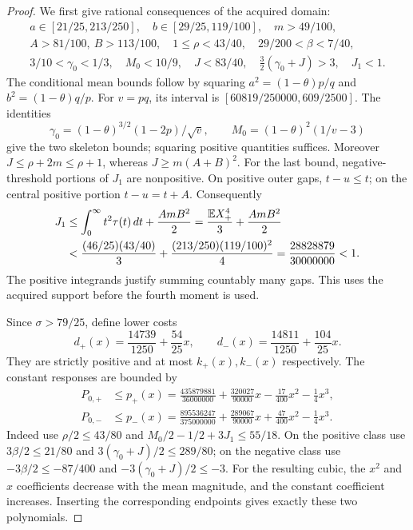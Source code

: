 \begin{proof}
We first give rational consequences of the acquired domain:
\begin{gather*}
 a\in[21/25,213/250],\quad b\in[29/25,119/100],\quad m>49/100,\\
 A>81/100,\ B>113/100,\quad 1\le\rho<43/40,\quad
 29/200<\beta<7/40,\\
 3/10<\gamma_0<1/3,\quad M_0<10/9,\quad
 J<83/40,\quad \tfrac32(\gamma_0+J)>3,\quad J_1<1.
\end{gather*}
The conditional mean bounds follow by squaring
$a^2=(1-\theta)p/q$ and $b^2=(1-\theta)q/p$.
For $v=pq$, its interval is
$[60819/250000,609/2500]$.
The identities
\[
 \gamma_0=(1-\theta)^{3/2}(1-2p)/\sqrt v,
 \qquad M_0=(1-\theta)^2(1/v-3)
\]
give the two skeleton bounds; squaring positive quantities suffices.
Moreover $J\le\rho+2m\le\rho+1$, whereas $J\ge m(A+B)^2$.
For the last bound, negative-threshold portions of $J_1$ are nonpositive.
On positive outer gaps, $t-u\le t$; on the central positive portion
$t-u=t+A$. Consequently
\begin{align*}
 J_1&\le\int_0^\infty t^2\tau(t)\,dt+\frac{AmB^2}{2}
 =\frac{\mathbb E X_+^4}{3}+\frac{AmB^2}{2}\\
 &<\frac{(46/25)(43/40)}3+\frac{(213/250)(119/100)^2}{4}
 =\frac{28828879}{30000000}<1.
\end{align*}
The positive integrands justify summing countably many gaps. This uses the
acquired support before the fourth moment is used.

Since $\sigma>79/25$, define lower costs
\[
 d_+(x)=\frac{14739}{1250}+\frac{54}{25}x,\qquad
 d_-(x)=\frac{14811}{1250}+\frac{104}{25}x.
\]
They are strictly positive and at most $k_+(x),k_-(x)$ respectively.
The constant responses are bounded by
\begin{align*}
 P_{0,+}&\le p_+(x)=\frac{435879881}{36000000}
              +\frac{320027}{90000}x-\frac{17}{400}x^2-\frac14x^3,\\
 P_{0,-}&\le p_-(x)=\frac{895536247}{375000000}
              +\frac{289067}{90000}x+\frac{47}{400}x^2-\frac14x^3.
\end{align*}
Indeed use $\rho/2\le43/80$ and
$M_0/2-1/2+3J_1\le55/18$.
On the positive class use $3\beta/2\le21/80$ and
$3(\gamma_0+J)/2\le289/80$; on the negative class use
$-3\beta/2\le-87/400$ and $-3(\gamma_0+J)/2\le-3$.
For the resulting cubic, the $x^2$ and $x$ coefficients decrease with
the mean magnitude, and the constant coefficient increases. Inserting
the corresponding endpoints gives exactly these two polynomials.


\end{proof}
